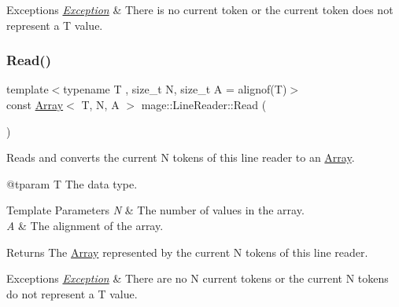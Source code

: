 \begin{DoxyExceptions}{Exceptions}
{\em \mbox{\hyperlink{classmage_1_1_exception}{Exception}}} & There is no current token or the current token does not represent a {\ttfamily T} value. \\
\hline
\end{DoxyExceptions}
\mbox{\label{classmage_1_1_line_reader_a208eb25a7715761178317eec72c93c75}} 
\subsubsection{\texorpdfstring{Read()}{Read()}\hspace{0.1cm}{\footnotesize\ttfamily [2/2]}}
{\footnotesize\ttfamily template$<$typename T , size\+\_\+t N, size\+\_\+t A = alignof(\+T)$>$ \\
const \mbox{\hyperlink{structmage_1_1_array}{Array}}$<$ T, N, A $>$ mage\+::\+Line\+Reader\+::\+Read (\begin{DoxyParamCaption}{ }\end{DoxyParamCaption})\hspace{0.3cm}{\ttfamily [protected]}}

Reads and converts the current {\ttfamily N} tokens of this line reader to an {\ttfamily \mbox{\hyperlink{structmage_1_1_array}{Array}}}.

@tparam T The data type. 
\begin{DoxyTemplParams}{Template Parameters}
{\em N} & The number of values in the array. \\
\hline
{\em A} & The alignment of the array. \\
\hline
\end{DoxyTemplParams}
\begin{DoxyReturn}{Returns}
The {\ttfamily \mbox{\hyperlink{structmage_1_1_array}{Array}}} represented by the current {\ttfamily N} tokens of this line reader. 
\end{DoxyReturn}

\begin{DoxyExceptions}{Exceptions}
{\em \mbox{\hyperlink{classmage_1_1_exception}{Exception}}} & There are no {\ttfamily N} current tokens or the current {\ttfamily N} tokens do not represent a {\ttfamily T} value. \\
\hline
\end{DoxyExceptions}
\mbox{\label{classmage_1_1_line_reader_aba8857b3d0f49250e312bd737d7d0e9c}} 
